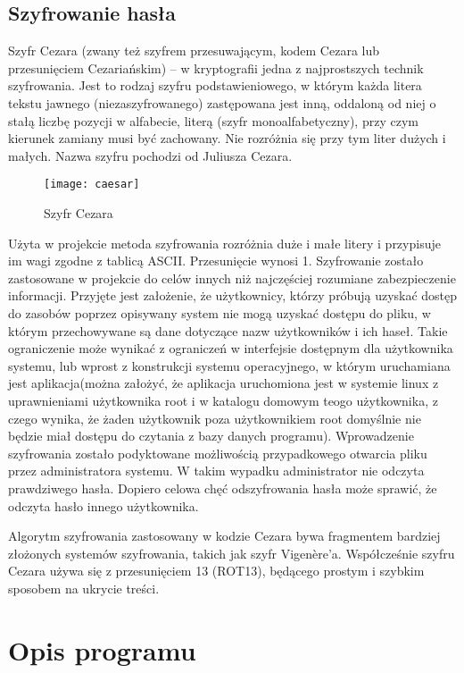 \documentclass[eng,printmode]{mgr}
\begin{document}
\section{Szyfrowanie hasła}

Szyfr Cezara (zwany też szyfrem przesuwającym, kodem Cezara lub przesunięciem Cezariańskim) – w kryptografii jedna z najprostszych technik szyfrowania. Jest to rodzaj szyfru podstawieniowego, w którym każda litera tekstu jawnego (niezaszyfrowanego) zastępowana jest inną, oddaloną od niej o stałą liczbę pozycji w alfabecie, literą (szyfr monoalfabetyczny), przy czym kierunek zamiany musi być zachowany. Nie rozróżnia się przy tym liter dużych i małych. Nazwa szyfru pochodzi od Juliusza Cezara.\cite{szyfrcezara}\\
\begin{figure}[placement h]
\texttt{[image: caesar]}
\caption{Szyfr Cezara}
\end{figure}

Użyta w projekcie metoda szyfrowania rozróżnia duże i małe litery i przypisuje im wagi zgodne z tablicą ASCII. Przesunięcie wynosi 1. Szyfrowanie zostało zastosowane w projekcie do celów innych niż najczęściej rozumiane zabezpieczenie informacji. Przyjęte jest założenie, że użytkownicy, którzy próbują uzyskać dostęp do zasobów poprzez opisywany system nie mogą uzyskać dostępu do pliku, w którym przechowywane są dane dotyczące nazw użytkowników i ich haseł. Takie ograniczenie może wynikać z ograniczeń w interfejsie dostępnym dla użytkownika systemu, lub wprost z konstrukcji systemu operacyjnego, w którym uruchamiana jest aplikacja(można założyć, że aplikacja uruchomiona jest w systemie linux z uprawnieniami użytkownika root i w katalogu domowym teogo użytkownika, z czego wynika, że żaden użytkownik poza użytkownikiem root domyślnie nie będzie miał dostępu do czytania z bazy danych programu). Wprowadzenie szyfrowania zostało podyktowane możliwością przypadkowego otwarcia pliku przez administratora systemu. W takim wypadku administrator nie odczyta prawdziwego hasła. Dopiero celowa chęć odszyfrowania hasła może sprawić, że odczyta hasło innego użytkownika.

Algorytm szyfrowania zastosowany w kodzie Cezara bywa fragmentem bardziej złożonych systemów szyfrowania, takich jak szyfr Vigenère'a. Współcześnie szyfru Cezara używa się z przesunięciem 13 (ROT13), będącego prostym i szybkim sposobem na ukrycie treści.
\chapter{Opis programu}
\end{document}
